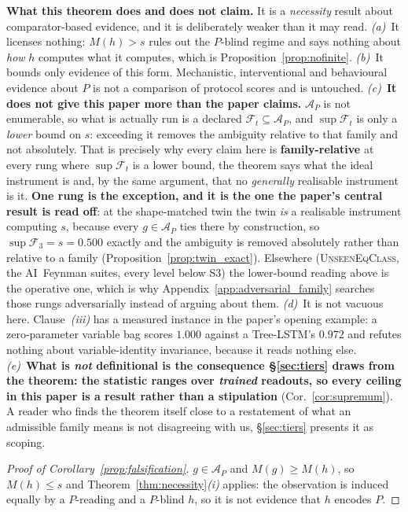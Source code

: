 \noindent \textbf{What this theorem does and does not claim.} It is a \emph{necessity} result about comparator-based evidence, and it is deliberately weaker than it may read. \emph{(a)}~It licenses nothing: $M(h)>s$ rules out the $P$-blind regime and says nothing about \emph{how} $h$ computes what it computes, which is Proposition~\ref{prop:nofinite}. \emph{(b)}~It bounds only evidence of this form. Mechanistic, interventional and behavioural evidence about $P$ is not a comparison of protocol scores and is untouched. \emph{(c)}~\textbf{It does not give this paper more than the paper claims.} $\mathcal{A}_P$ is not enumerable, so what is actually run is a declared $\mathcal{F}_t\subseteq\mathcal{A}_P$, and $\sup\mathcal{F}_t$ is only a \emph{lower} bound on $s$: exceeding it removes the ambiguity relative to that family and not absolutely. That is precisely why every claim here is \textbf{family-relative} at every rung where $\sup\mathcal{F}_t$ is a lower bound, the theorem says what the ideal instrument is and, by the same argument, that no \emph{generally} realisable instrument is it. \textbf{One rung is the exception, and it is the one the paper's central result is read off}: at the shape-matched twin the twin \emph{is} a realisable instrument computing $s$, because every $g\in\mathcal{A}_P$ ties there by construction, so $\sup\mathcal{F}_3=s=0.500$ exactly and the ambiguity is removed absolutely rather than relative to a family (Proposition~\ref{prop:twin_exact}). Elsewhere (\textsc{UnseenEqClass}, the AI~Feynman suites, every level below S3) the lower-bound reading above is the operative one, which is why Appendix~\ref{app:adversarial_family} searches those rungs adversarially instead of arguing about them. \emph{(d)}~It is not vacuous here. Clause~\emph{(iii)} has a measured instance in the paper's opening example: a zero-parameter variable bag scores $1.000$ against a Tree-LSTM's $0.972$ and refutes nothing about variable-identity invariance, because it reads nothing else. \emph{(e)}~\textbf{What is \emph{not} definitional is the consequence \S\ref{sec:tiers} draws from the theorem: the statistic ranges over \emph{trained} readouts, so every ceiling in this paper is a result rather than a stipulation} (Cor.~\ref{cor:supremum}). A reader who finds the theorem itself close to a restatement of what an admissible family means is not disagreeing with us, \S\ref{sec:tiers} presents it as scoping.

\begin{proof}[Proof of Corollary~\ref{prop:falsification}]
$g\in\mathcal{A}_P$ and $M(g)\geq M(h)$, so $M(h)\leq s$ and Theorem~\ref{thm:necessity}\emph{(i)} applies: the observation is induced equally by a $P$-reading and a $P$-blind $h$, so it is not evidence that $h$ encodes $P$.
\end{proof}

